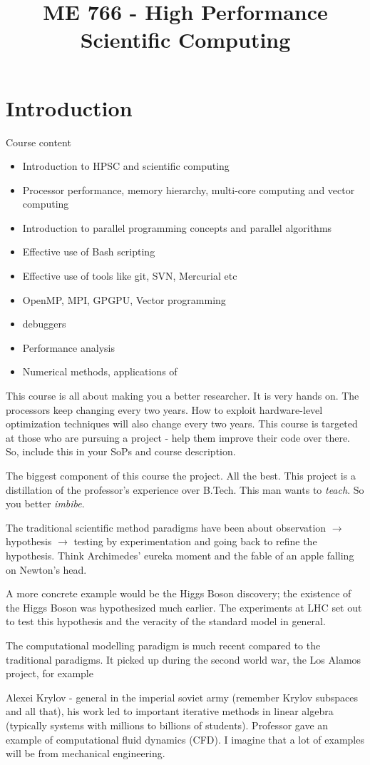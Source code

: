 \documentclass[a4paper]{article}
\title{ME 766 - High Performance Scientific Computing}
\begin{document}
\section*{Introduction}
Course content
\begin{itemize}
	\item Introduction to HPSC and scientific computing
	\item Processor performance, memory hierarchy, multi-core computing and vector computing
	\item Introduction  to parallel programming concepts and parallel algorithms
	\item Effective use of Bash scripting
	\item Effective use of tools like git, SVN, Mercurial etc
	\item OpenMP, MPI, GPGPU, Vector programming
	\item debuggers
	\item Performance analysis
	\item Numerical methods, applications of 
\end{itemize}

This course is all about making you a better researcher. It
is very hands on.
The processors keep changing every two years.
How to exploit hardware-level optimization techniques will also
change every two years. This course is targeted at those who are
pursuing a project - help them improve their code over there. So,
include this in your SoPs and course description. 

The biggest component of this course the project. All the best.
This project is a distillation of the professor's experience over
B.Tech. This man wants to \emph{teach}. So you better \emph{imbibe}. 

The traditional scientific method paradigms have been about observation 
$\to $ hypothesis $\to $ testing by experimentation and going back
to refine the hypothesis. Think Archimedes' eureka moment and
the fable of an apple falling on Newton's head.

A more concrete example would be the Higgs Boson discovery; the 
existence of the Higgs Boson was hypothesized much earlier.
The experiments at LHC set out to test this hypothesis and the
veracity of the standard model in general.

The computational modelling paradigm is much recent compared to the
traditional paradigms. It picked up during the second world war,
the Los Alamos project, for example

Alexei Krylov - general in the imperial soviet army (remember Krylov
subspaces and all that), his work led to important iterative methods
in linear algebra (typically systems with millions to billions of students).
Professor gave an example of computational fluid dynamics (CFD). I imagine
that a lot of examples will be from mechanical engineering.
\end{document}
